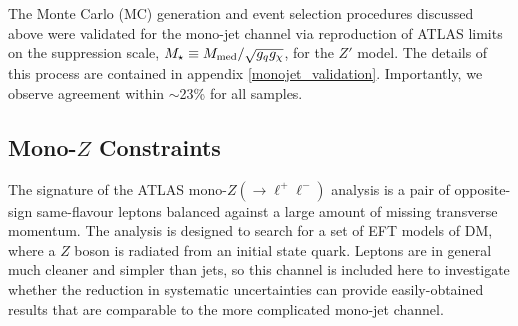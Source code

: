 The Monte Carlo (MC) generation and event selection procedures discussed above were validated for the mono-jet channel via reproduction of ATLAS limits on the suppression scale, $M_{\star} \equiv M_{\mathrm{med}} / \sqrt{g_q g_{\chi}}$, for the $Z'$ model. The details of this process are contained in appendix \ref{monojet_validation}. Importantly, we observe agreement within $\sim$23\% for all samples.



\subsection{Mono-$Z$ Constraints}
\label{monoZ_constraints}
The signature of the ATLAS mono-$Z(\rightarrow \ell^+ \ell^-)$ analysis \cite{Aad:2014monoZlep} is a pair of opposite-sign same-flavour leptons balanced against a large amount of missing transverse momentum. The analysis is designed to search for a set of EFT models of DM, where a $Z$ boson is radiated from an initial state quark. Leptons are in general much cleaner and simpler than jets, so this channel is included here to investigate whether the reduction in systematic uncertainties can provide easily-obtained results that are comparable to the more complicated mono-jet channel.

